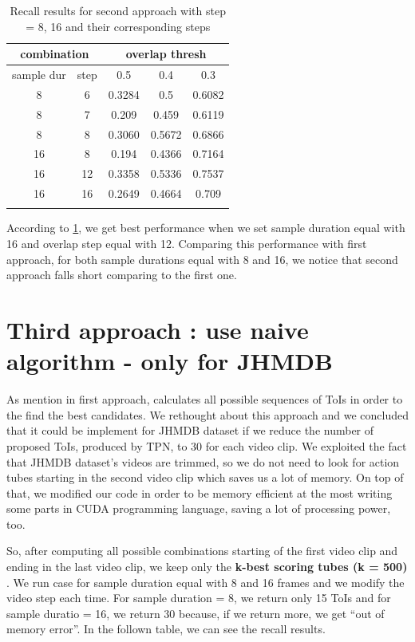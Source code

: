 \documentclass{report}
\begin{document}
\begin{center}
\begin{longtable}{||c c||c c c||}
  \hline
  \multicolumn{2}{||c||}{\textbf{combination}} &\multicolumn{3}{|c||}{\textbf{overlap thresh}}\\

  \hline
  sample dur & step &   0.5  &  0.4 &  0.3 \\
  \hline   \hline
  8 & 6 & 0.3284 & 0.5 & 0.6082  \\
  \hline
  8 & 7 & 0.209	& 0.459 & 0.6119 \\
  \hline
  8 & 8 & 0.3060 & 0.5672 & 0.6866 \\
  \hline
  16 & 8  & 0.194 & 0.4366 & 0.7164 \\
  \hline
  16 & 12 & 0.3358 & 0.5336 & 0.7537 \\
  \hline
  16 & 16 & 0.2649 & 0.4664 & 0.709 \\
  
  \hline     \hline                          

  \caption{Recall results for second approach with step = 8, 16 and their corresponding steps }
  \label{table:conn_app2}
\end{longtable} 
\end{center}

According to \ref{table:conn_app2}, we get best performance when we set sample duration equal with  16 and overlap step equal with 12.
Comparing this performance with first approach, for both sample durations equal with 8 and 16, we notice that second approach falls short
comparing to the first one. 

\section{Third approach : use naive algorithm - only for JHMDB}

As mention in first approach,  \cite{DBLP:journals/corr/HouCS17} calculates all possible sequences of ToIs in order to the find the best
candidates. We rethought about this approach and we concluded that it could be implement for JHMDB dataset if we reduce the number of proposed
ToIs, produced by TPN,  to 30 for each video clip. We exploited the fact that JHMDB dataset's videos are trimmed, so we do not need to look
for action tubes starting in the second video clip which saves us a lot of memory. On top of that, we modified our code
in order to be memory efficient at the most writing some parts in CUDA programming language, saving a lot of processing power, too. \par
So, after computing all possible combinations starting of the first video clip and ending in the last video clip, we keep only the
\textbf{k-best scoring tubes (k = 500) }. We run case for sample duration equal with 8 and 16 frames and we modify the video step each time.
For sample duration = 8, we return only 15 ToIs and for sample duratio = 16, we return 30 because, if we return more, we get ``out of memory error''.
In the follown table, we can see the recall results. \par
\end{document}
